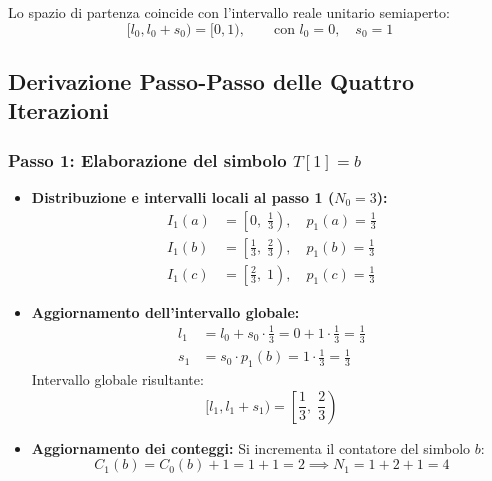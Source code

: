 Lo spazio di partenza coincide con l'intervallo reale unitario semiaperto:
\begin{equation}
  [l_0, l_0 + s_0) = [0, 1), \qquad \text{con } l_0 = 0, \quad s_0 = 1
\end{equation}

\FloatBarrier
\subsection{Derivazione Passo-Passo delle Quattro Iterazioni}
\label{subsec:derivazione-passi-aritmetica-adattiva}

\subsubsection*{Passo 1: Elaborazione del simbolo $T[1] = b$}
\begin{itemize}
  \item \textbf{Distribuzione e intervalli locali al passo 1 ($N_0 = 3$):}
  \begin{align}
    I_1(a) &= \left[ 0, \; \frac{1}{3} \right), \quad p_1(a) = \frac{1}{3} \\
    I_1(b) &= \left[ \frac{1}{3}, \; \frac{2}{3} \right), \quad p_1(b) = \frac{1}{3} \\
    I_1(c) &= \left[ \frac{2}{3}, \; 1 \right), \quad p_1(c) = \frac{1}{3}
  \end{align}
  \item \textbf{Aggiornamento dell'intervallo globale:}
  \begin{align}
    l_1 &= l_0 + s_0 \cdot \frac{1}{3} = 0 + 1 \cdot \frac{1}{3} = \frac{1}{3} \\
    s_1 &= s_0 \cdot p_1(b) = 1 \cdot \frac{1}{3} = \frac{1}{3}
  \end{align}
  Intervallo globale risultante:
  \begin{equation}
    [l_1, l_1 + s_1) = \left[ \frac{1}{3}, \; \frac{2}{3} \right)
  \end{equation}
  \item \textbf{Aggiornamento dei conteggi:} Si incrementa il contatore del simbolo $b$:
  \begin{equation}
    C_1(b) = C_0(b) + 1 = 1 + 1 = 2 \implies N_1 = 1 + 2 + 1 = 4
  \end{equation}
\end{itemize}

